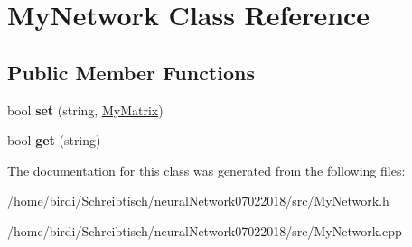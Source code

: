 \hypertarget{classMyNetwork}{}\section{My\+Network Class Reference}
\label{classMyNetwork}
\subsection*{Public Member Functions}
\begin{DoxyCompactItemize}
\item 
\mbox{\label{classMyNetwork_ab448bee30af599e72633e86e70aa33d8}} 
bool {\bfseries set} (string, \mbox{\hyperlink{classMyMatrix}{My\+Matrix}})
\item 
\mbox{\label{classMyNetwork_a713645b9e6d4ee1048d328d3f319477b}} 
bool {\bfseries get} (string)
\end{DoxyCompactItemize}


The documentation for this class was generated from the following files\+:\begin{DoxyCompactItemize}
\item 
/home/birdi/\+Schreibtisch/neural\+Network07022018/src/My\+Network.\+h\item 
/home/birdi/\+Schreibtisch/neural\+Network07022018/src/My\+Network.\+cpp\end{DoxyCompactItemize}
